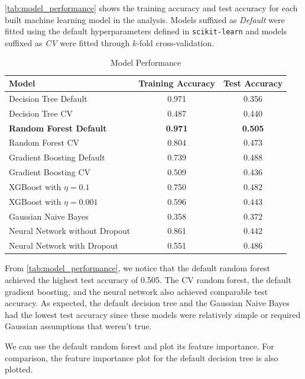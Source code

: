 \documentclass{article}
\begin{document}
\autoref*{tab:model_performance} shows the training accuracy and test accuracy for each built machine learning model in the analysis. Models suffixed as \textit{Default} were fitted using the default hyperparameters defined in \texttt{scikit-learn} and models suffixed as \textit{CV} were fitted through \(k\)-fold cross-validation.

\begin{table}[htbp]
    \centering
    \begin{tabular}{lcc}
        \toprule
        \textbf{Model} & \textbf{Training Accuracy} & \textbf{Test Accuracy} \\
        \midrule
        Decision Tree Default & 0.971 & 0.356 \\[3pt]
        Decision Tree CV & 0.487 & 0.440 \\[3pt]
        \textbf{Random Forest Default} & \textbf{0.971} & \textbf{0.505} \\[3pt]
        Random Forest CV & 0.804 & 0.473 \\[3pt]
        Gradient Boosting Default & 0.739 & 0.488 \\[3pt]
        Gradient Boosting CV & 0.509 & 0.436 \\[3pt]
        XGBoost with \(\eta = 0.1\) & 0.750 & 0.482 \\[3pt]
        XGBoost with \(\eta = 0.001\) & 0.596 & 0.443 \\[3pt]
        Gaussian Naive Bayes & 0.358 & 0.372 \\[3pt]
        Neural Network without Dropout & 0.861 & 0.442 \\[3pt]
        Neural Network with Dropout & 0.551 & 0.486 \\
        \bottomrule
    \end{tabular}
    \caption{Model Performance}
    \label{tab:model_performance}
\end{table}

From \autoref*{tab:model_performance}, we notice that the default random forest achieved the highest test accuracy of 0.505. The CV random forest, the default gradient boosting, and the neural network also achieved comparable test accuracy. As expected, the default decision tree and the Gaussian Naive Bayes had the lowest test accuracy since these models were relatively simple or required Gaussian assumptions that weren't true.

We can use the default random forest and plot its feature importance. For comparison, the feature importance plot for the default decision tree is also plotted.
\end{document}
